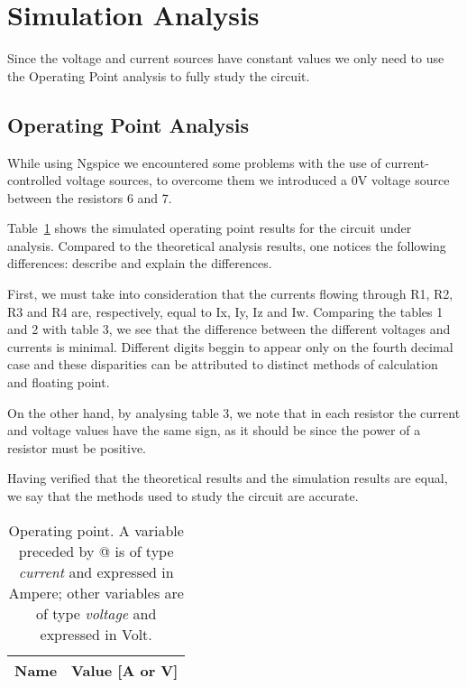 \section{Simulation Analysis}
\label{sec:simulation}
Since the voltage and current sources have constant values we only need to use the Operating Point analysis to fully study the circuit.

\subsection{Operating Point Analysis}

While using Ngspice we encountered some problems with the use of current-controlled voltage sources, to overcome them we introduced a 0V voltage source between the resistors 6 and 7.

Table~\ref{tab:op} shows the simulated operating point results for the circuit
under analysis. Compared to the theoretical analysis results, one notices the
following differences: describe and explain the differences.

First, we must take into consideration that the currents flowing through R1, R2, R3 and R4 are, respectively, equal to Ix, Iy, Iz and Iw.
Comparing the tables 1 and 2 with table 3, we see that the difference between the different voltages and currents is minimal. Different digits beggin to appear only on the fourth decimal case and these disparities can be attributed to distinct methods of calculation and floating point.\par
On the other hand, by analysing table 3, we note that in each resistor the current and voltage values have the same sign, as it should be since the power of a resistor must be positive. \par
Having verified that the theoretical results and the simulation results are equal, we say that the methods used to study the circuit are accurate.


\begin{table}[h]
  \centering
  \begin{tabular}{|l|r|}
    \hline    
    {\bf Name} & {\bf Value [A or V]} \\ \hline
    
  \end{tabular}
  \caption{Operating point. A variable preceded by @ is of type {\em current}
    and expressed in Ampere; other variables are of type {\it voltage} and expressed in
    Volt.}
  \label{tab:op}
\end{table}





